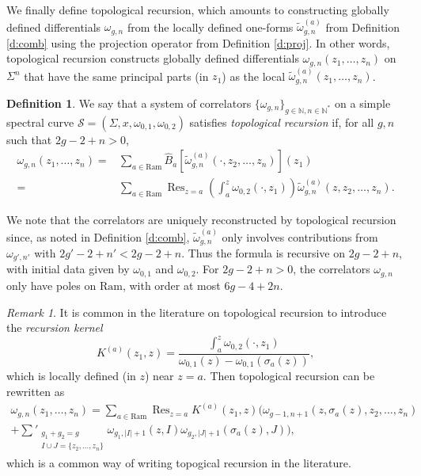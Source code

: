 \documentclass[reqno,oneside,11pt]{amsart}
\theoremstyle{plain}
\theoremstyle{definition}
\newtheorem{definition}[theorem]{Definition}
\theoremstyle{remark}
\newtheorem{remark}[theorem]{Remark}
\numberwithin{equation}{section}
\DeclareMathOperator*{\Res}{Res}
\newcommand{\Ra}{\text{Ram}}
\begin{document}
We finally define topological recursion, which amounts to constructing globally defined differentials $\omega_{g,n}$ from the locally defined one-forms $\tilde{\omega}_{g,n}^{(a)}$ from Definition \ref{d:comb} using the projection operator from Definition \ref{d:proj}. In other words, topological recursion constructs globally defined differentials $\omega_{g,n}(z_1,\ldots,z_n)$ on $\Sigma^n$ that have the same principal parts (in $z_1$) as the local $\tilde{\omega}^{(a)}_{g,n}(z_1,\ldots,z_n)$.

\begin{definition}\label{d:TR}
We say that a system of correlators $\{\omega_{g,n} \}_{g \in \mathbb{N}, n \in \mathbb{N}^* }$ on a simple spectral curve $\mathcal{S} = (\Sigma,x,\omega_{0,1}, \omega_{0,2})$ satisfies \emph{topological recursion} if, for all $g,n$ such that $2g-2+n > 0$, 
\begin{align}\label{eq:TR}
\omega_{g,n}(z_1,\ldots,z_n) =&\sum_{a \in \Ra} \hat{B}_{a}[\tilde{\omega}^{(a)}_{g,n}(\cdot, z_2, \ldots, z_n)](z_1)\\
=& \sum_{a \in \Ra} \Res_{z=a} \left(\int_a^z  \omega_{0,2}(\cdot, z_1) \right) \tilde{\omega}^{(a)}_{g,n}(z, z_2, \ldots, z_n).
\end{align}
\end{definition}

We note that the correlators are uniquely reconstructed by topological recursion since, as noted in Definition \ref{d:comb}, $\tilde{\omega}^{(a)}_{g,n}$ only involves contributions from $\omega_{g',n'}$ with $2g'-2+n' < 2g-2+n$. Thus the formula is recursive on $2g-2+n$, with initial data given by $\omega_{0,1}$ and $\omega_{0,2}$. For $2g-2+n>0$, the correlators $\omega_{g,n}$ only have poles on $\Ra$, with order at most $6g-4+2n$.

\begin{remark}
It is common in the literature on topological recursion to introduce the \emph{recursion kernel}
\begin{equation}
K^{(a)}(z_1,z) =  \frac{\int^z_a \omega_{0,2}(\cdot, z_1) }{\omega_{0,1}(z) - \omega_{0,1}(\sigma_a(z))},
\end{equation}
which is locally defined (in $z$) near $z=a$. Then topological recursion can be rewritten as
\begin{multline}\label{eq:TR2}
\omega_{g,n}(z_1, \ldots, z_n) = \sum_{a \in \Ra} \Res_{z=a} K^{(a)}(z_1,z)  \Big( \omega_{g-1,n+1}(z, \sigma_a(z), z_2, \ldots, z_n) \\+ \sum'_{\substack{g_1+g_2=g \\ I \cup J = \{z_2, \ldots, z_n \}}} \omega_{g_1, |I|+1}(z, I) \omega_{g_2, |J|+1} (\sigma_a(z), J) \Big),
\end{multline}
which is a common way of writing topogical recursion in the literature.
\end{remark}
\end{document}
